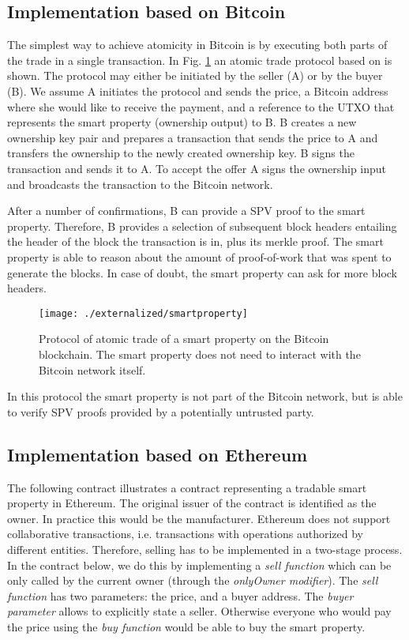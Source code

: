 \subsection{Implementation based on Bitcoin}

The simplest way to achieve atomicity in Bitcoin is by executing both parts of the trade in a single transaction. In Fig. \ref{fig:smartproperty} an atomic trade protocol based on \cite{smartproperty2011} is shown. The protocol may either be initiated by the seller (A) or by the buyer (B). We assume A initiates the protocol and sends the price, a Bitcoin address where she would like to receive the payment, and a reference to the \ac{UTXO} that represents the smart property (ownership output) to B. B creates a new ownership key pair and prepares a transaction that sends the price to A and transfers the ownership to the newly created ownership key. B signs the transaction and sends it to A. To accept the offer A signs the ownership input and broadcasts the transaction to the Bitcoin network. 

After a number of confirmations, B can provide a \ac{SPV} proof to the smart property. Therefore, B provides a selection of subsequent block headers entailing the header of the block the transaction is in, plus its merkle proof. The smart property is able to reason about the amount of proof-of-work that was spent to generate the blocks. In case of doubt, the smart property can ask for more block headers.

\begin{figure}[!t]
    \centering
    \texttt{[image: ./externalized/smartproperty]}
    \caption{Protocol of atomic trade of a smart property on the Bitcoin blockchain. The smart property does not need to interact with the Bitcoin network itself.}
    \label{fig:smartproperty}
  \end{figure}

In this protocol the smart property is not part of the Bitcoin network, but is able to verify \ac{SPV} proofs provided by a potentially untrusted party. 

\subsection{Implementation based on Ethereum}

The following contract illustrates a contract representing a tradable smart property in Ethereum. The original issuer of the contract is identified as the owner. In practice this would be the manufacturer. Ethereum does not support collaborative transactions, i.e. transactions with operations authorized by different entities. Therefore, selling has to be implemented in a two-stage process. In the contract below, we do this by implementing a \emph{sell function} which can be only called by the current owner (through the \emph{onlyOwner modifier}). The \emph{sell function} has two parameters: the price, and a buyer address. The \emph{buyer parameter} allows to explicitly state a seller. Otherwise everyone who would pay the price using the \emph{buy function} would be able to buy the smart property.

